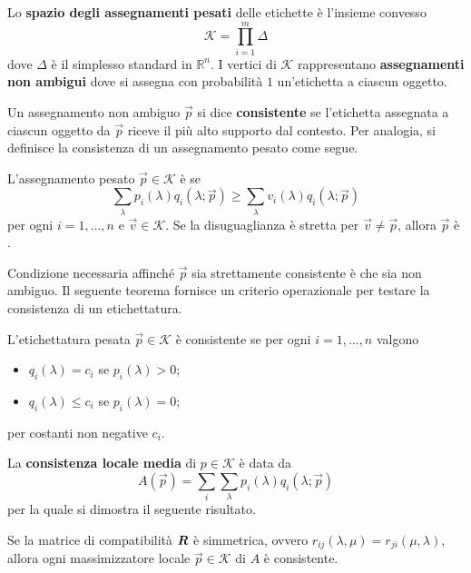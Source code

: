 Lo \textbf{spazio degli assegnamenti pesati} delle etichette è l'insieme convesso
\begin{displaymath}
	\mathcal{K} = \prod_{i = 1}^m \Delta
\end{displaymath}
dove $\Delta$ è il simplesso standard in $\mathbb{R}^n$. I vertici di $\mathcal{K}$ rappresentano \textbf{assegnamenti non ambigui} dove si assegna con probabilità $1$ un'etichetta a ciascun oggetto.

Un assegnamento non ambiguo $\vec{p}$ si dice \textbf{consistente} se l'etichetta assegnata a ciascun oggetto da $\vec{p}$ riceve il più alto supporto dal contesto. Per analogia, si definisce la consistenza di un assegnamento pesato come segue.
\begin{mydef}
	L'assegnamento pesato $\vec{p} \in \mathcal{K}$ è  se
	\begin{displaymath}
		\sum_\lambda p_i(\lambda)q_i(\lambda; \vec{p}) \geq \sum_\lambda v_i(\lambda) q_i(\lambda; \vec{p})
	\end{displaymath}
	per ogni $i = 1, \dots, n$ e $\vec{v} \in \mathcal{K}$. Se la disuguaglianza è stretta per $\vec{v} \neq \vec{p}$, allora $\vec{p}$ è .
\end{mydef}
\noindent Condizione necessaria affinché $\vec{p}$ sia strettamente consistente è che sia non ambiguo. Il seguente teorema fornisce un criterio operazionale per testare la consistenza di un etichettatura.
\begin{thm}
	L'etichettatura pesata $\vec{p} \in \mathcal{K}$ è consistente se per ogni $i = 1, \dots, n$ valgono
	\begin{itemize}
		\item $q_i(\lambda) = c_i$ se $p_i(\lambda) > 0$;
		\item $q_i(\lambda) \leq c_i$ se $p_i(\lambda) = 0$;
	\end{itemize}
	per costanti non negative $c_i$.
\end{thm}
\noindent La \textbf{consistenza locale media} di $p \in \mathcal{K}$ è data da
\begin{displaymath}
	A(\vec{p}) = \sum_i \sum_\lambda p_i(\lambda) q_i(\lambda; \vec{p})
\end{displaymath}
per la quale si dimostra il seguente risultato.
\begin{thm}
	Se la matrice di compatibilità $\mat{R}$ è simmetrica, ovvero $r_{ij}(\lambda, \mu) = r_{ji}(\mu, \lambda)$, allora ogni massimizzatore locale $\vec{p} \in \mathcal{K}$ di $A$ è consistente.
\end{thm}

